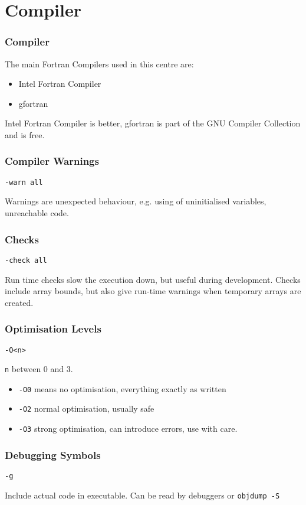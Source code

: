 \section{Compiler}
\begin{frame}
    \frametitle{Compiler}
    The main Fortran Compilers used in this centre are:
    \begin{itemize}
        \item Intel Fortran Compiler
        \item gfortran
    \end{itemize}
    Intel Fortran Compiler is better, gfortran is part of the GNU Compiler Collection and is free.
\end{frame}
\begin{frame}[fragile]
    \frametitle{Compiler Warnings}
    \begin{lstlisting}[numbers=none]
    -warn all
    \end{lstlisting}
    Warnings are unexpected behaviour, e.g. using of uninitialised variables, unreachable code.
\end{frame}
\begin{frame}[fragile]
    \frametitle{Checks}
    \begin{lstlisting}[numbers=none]
    -check all
    \end{lstlisting}
    Run time checks slow the execution down, but useful during development.
    Checks include array bounds, but also give run-time warnings when temporary arrays are created.
\end{frame}
\begin{frame}[fragile]
    \frametitle{Optimisation Levels}
    \begin{lstlisting}[numbers=none]
    -O<n>
    \end{lstlisting}
    \texttt{n} between 0 and 3.
    \begin{itemize}
    \item \texttt{-O0} means no optimisation, everything exactly as written
    \item \texttt{-O2} normal optimisation, usually safe
    \item \texttt{-O3} strong optimisation, can introduce errors, use with care.
    \end{itemize}
\end{frame}
\begin{frame}[fragile]
    \frametitle{Debugging Symbols}
    \begin{lstlisting}[numbers=none]
    -g
    \end{lstlisting}
    Include actual code in executable. Can be read by debuggers or \texttt{objdump -S}
\end{frame}
